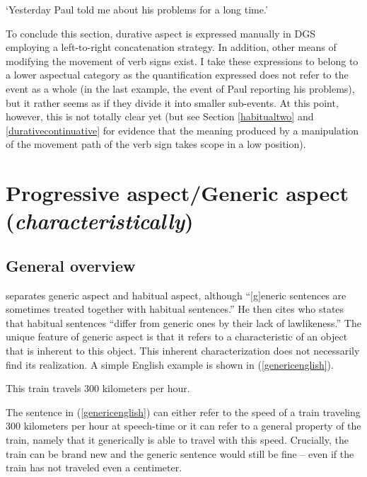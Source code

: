 \begin{exe}
\glt `Yesterday Paul told me about his problems for a long time.' \label{ex:durativetwodgs}
\end{exe} 

\noindent To conclude this section, durative aspect is expressed manually in DGS employing a left-to-right concatenation strategy. In addition, other means of modifying the movement of verb signs exist. I take these expressions to belong to a lower aspectual category as the quantification expressed does not refer to the event as a whole (in the last example, the event of Paul reporting his problems), but it rather seems as if they divide it into smaller sub-events. At this point, however, this is not totally clear yet (but see Section \ref{habitualtwo} and \ref{durativecontinuative} for evidence that the meaning produced by a manipulation of the movement path of the verb sign takes scope in a low position).

\section{Progressive aspect/Generic aspect (\textit{characteristically})}\label{characteristic}
\subsection{General overview}
\citet[99]{cinque1999adverbs} separates generic aspect and habitual aspect, although ``$[$g$]$e\-ner\-ic sentences are sometimes treated together with habitual sentences.'' He then cites \citet[97]{dahl1985tense} who states that habitual sentences ``differ from generic ones by their lack of lawlikeness.'' The unique feature of generic aspect is that it refers to a characteristic of an object that is inherent to this object. This inherent characterization does not necessarily find its realization. A simple English example is shown in (\ref{genericenglish}).

\begin{exe}
\ex This train travels 300 kilometers per hour. \label{genericenglish}
\end{exe} 

\noindent The sentence in (\ref{genericenglish}) can either refer to the speed of a train traveling 300 kilometers per hour at speech-time or it can refer to a general property of the train, namely that it generically is able to travel with this speed. Crucially, the train can be brand new and the generic sentence would still be fine -- even if the train has not traveled even a centimeter. 

